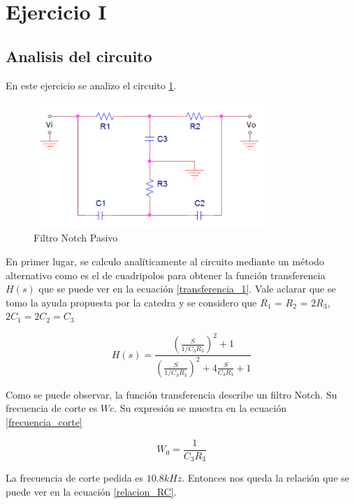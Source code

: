 \documentclass[12pt,a4paper]{article}
\begin{document}
\section{Ejercicio I}
\subsection{Analisis del circuito}
En este ejercicio se analizo el circuito \ref{fig:circuito_1}. 

\begin{figure}[ht]                                                       
    \centering\includegraphics[width=0.8\textwidth]{circuito_1.png}
    \caption{Filtro Notch Pasivo}
    \label{fig:circuito_1}
    \end{figure}


En primer lugar, se calculo analíticamente al circuito mediante un método alternativo como es el de cuadripolos para
obtener la función transferencia $H(s)$ que se puede ver en la ecuación \ref{transferencia_1}. Vale aclarar que se tomo la ayuda propuesta por la catedra y se considero que $R_{1}$ = $R_{2}$
= $2R_{3}$, $2C_{1} = 2C_{2} = C_{3}$

\begin{equation} H(s) = \frac{(\frac{S}{1/C_{3} R_{3}})^2 + 1} {(\frac{S}{1/C_{3}R_{3}})^2 + 4\frac{S}{C_{3}R_{3}} + 1}  \label{transferencia_1}\end{equation}

Como se puede observar, la función transferencia describe un filtro Notch. Su frecuencia de corte es
$Wc$. Su expresión se muestra en la ecuación \ref{frecuencia_corte}

\begin{equation} W_{0} =  \frac{1}{C_{3} R_{3}}  \label{frecuencia_corte}\end{equation}

La frecuencia de corte pedida es $10.8k Hz$. Entonces nos queda la relación que se puede ver en la ecuación 
\ref{relacion_RC}.
\end{document}
